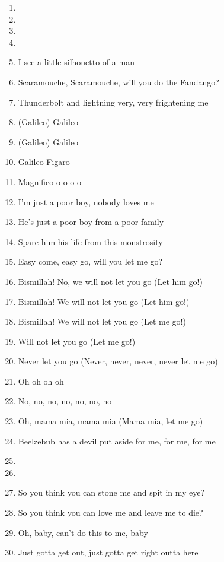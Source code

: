 \documentclass{article}
\begin{document}
\begin{center}
\begin{enumerate}
            \item[]
            \item[] \instrumental

            \item[]
            \item[] 
            \item I see a little silhouetto of a man
            \item Scaramouche, Scaramouche, will you do the Fandango?
            \item Thunderbolt and lightning very, very frightening me
            \item (Galileo) Galileo
            \item (Galileo) Galileo
            \item Galileo Figaro
            \item Magnifico-o-o-o-o
            \item I'm just a poor boy, nobody loves me
            \item He's just a poor boy from a poor family
            \item Spare him his life from this monstrosity
            \item Easy come, easy go, will you let me go?
            \item Bismillah! No, we will not let you go (Let him go!)
            \item Bismillah! We will not let you go (Let him go!)
            \item Bismillah! We will not let you go (Let me go!)
            \item Will not let you go (Let me go!)
            \item Never let you go (Never, never, never, never let me go)
            \item Oh oh oh oh
            \item No, no, no, no, no, no, no
            \item Oh, mama mia, mama mia (Mama mia, let me go)
            \item Beelzebub has a devil put aside for me, for me, for me

            \pagebreak

            \item[]
            \item[] 
            \item So you think you can stone me and spit in my eye?
            \item So you think you can love me and leave me to die?
            \item Oh, baby, can't do this to me, baby
            \item Just gotta get out, just gotta get right outta here


\end{enumerate}
\end{center}
\end{document}
